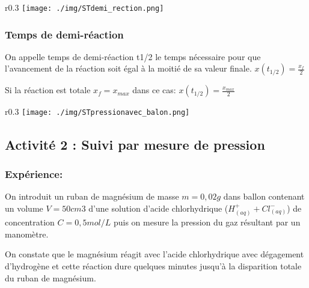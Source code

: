 \documentclass[12pt]{article}
\begin{document}
\begin{wrapfigure}[1]{r}{0.3\textwidth}
	\vspace{-3cm}
	\texttt{[image: ./img/STdemi\_rection.png]}
\end{wrapfigure}

\subsubsection{Temps de demi-réaction}
On appelle temps de demi-réaction t1/2 le temps nécessaire pour que l'avancement de la réaction soit égal à la moitié de sa valeur finale. $x(t_{1/2}) = \frac{x_f}{2}$

Si la réaction est totale $x_f=x_{max}$ dans ce cas: $x(t_{1/2}) = \frac{x_{max}}{2}$




\newpage
\begin{wrapfigure}[2]{r}{0.3\textwidth}
  \vspace{-3cm}
	\texttt{[image: ./img/STpressionavec\_balon.png]}
\end{wrapfigure}



\subsection{Activité 2 : Suivi par mesure de pression }
\subsubsection{Expérience: }
On introduit un ruban de magnésium de masse $m=0,02g$ dans ballon contenant un volume $V=50cm3$
d'une solution d'acide chlorhydrique ($H^+_{(aq)} + Cl^-_{(aq)}$) de concentration $C=0,5mol/L$ puis on mesure la pression du gaz résultant par un manomètre.

\vspace{0.2cm}

On constate que le magnésium réagit avec l'acide chlorhydrique avec dégagement d'hydrogène et cette réaction dure quelques
minutes jusqu'à la disparition totale du ruban de magnésium.
\end{document}
